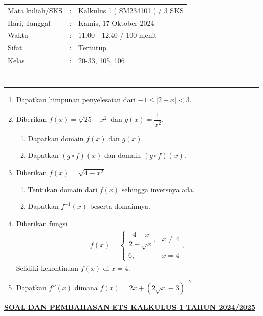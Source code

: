 \documentclass[10pt,openany,a4paper]{article}
\theoremstyle{definition}
\theoremstyle{definition}
\theoremstyle{plain}
\begin{document}
    \begin{center}
	\begin{tabular}{lcl}
		Mata kuliah/SKS & : & Kalkulus 1 ( SM234101 ) / 3 SKS\\
		Hari, Tanggal & : & Kamis, 17 Oktober 2024\\
		Waktu & : & 11.00 - 12.40 / 100 menit\\
		Sifat & : & Tertutup\\
		Kelas & : & 20-33, 105, 106\\
  ~
	\end{tabular}

    \noindent\rule{\textwidth}{2.pt}
        \end{center}
    \begin{enumerate}
    \item Dapatkan himpunan penyelesaian dari $-1\leq |2-x|<3$.

    \item Diberikan $f(x)=\sqrt{25-x^2}$ dan $g(x)=\dfrac{1}{x^2}$.
    \begin{enumerate}
        \item Dapatkan domain $f(x)$ dan $g(x)$.
        \item Dapatkan $(g\circ f)(x)$ dan domain $(g\circ f)(x)$.
    \end{enumerate}

    \item Diberikan $f(x)=\sqrt{4-x^2}$.
    \begin{enumerate}
        \item Tentukan domain dari $f(x)$ sehingga inversnya ada.
        \item Dapatkan $f^{-1}(x)$ beserta domainnya.
    \end{enumerate}

    \item Diberikan fungsi
    \begin{align*}
        f(x)=\begin{cases}
            \dfrac{4-x}{2-\sqrt{x}}, & x\neq 4\\
            6, & x=4
        \end{cases},
    \end{align*}
    Selidiki kekontinuan $f(x)$ di $x=4$.

    \item Dapatkan $f''(x)$ dimana $f(x)=2x+\left(2\sqrt{x}-3\right)^{-2}$.
\end{enumerate}
\newpage
 \begin{center}
	{\underline{\textbf{\MakeUppercase{Soal dan Pembahasan ETS Kalkulus 1 Tahun 2024/2025}}}}
    \end{center}
\end{document}
